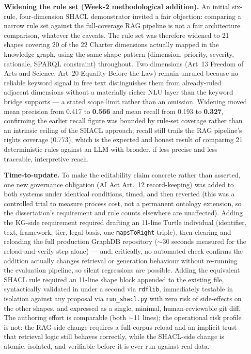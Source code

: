 \textbf{Widening the rule set (Week-2 methodological addition).} An initial six-rule, four-dimension SHACL demonstrator invited a fair objection: comparing a narrow rule set against the full-coverage RAG pipeline is not a fair architecture comparison, whatever the caveats. The rule set was therefore widened to 21 shapes covering 20 of the 22 Charter dimensions actually mapped in the knowledge graph, using the same shape pattern (dimension, priority, severity, rationale, SPARQL constraint) throughout. Two dimensions (Art~13 Freedom of Arts and Science; Art~20 Equality Before the Law) remain unruled because no reliable keyword signal in free text distinguishes them from already-ruled adjacent dimensions without a materially richer NLU layer than the keyword bridge supports --- a stated scope limit rather than an omission. Widening moved mean precision from 0.417 to \textbf{0.566} and mean recall from 0.193 to \textbf{0.327}, confirming the earlier recall figure was bounded by rule-set coverage rather than an intrinsic ceiling of the SHACL approach; recall still trails the RAG pipeline's rights coverage (0.773), which is the expected and honest result of comparing 21 deterministic rules against an LLM with broader, if less precise and less traceable, interpretive reach.

\textbf{Time-to-update.} To make the editability claim concrete rather than asserted, one new governance obligation (AI Act Art.~12 record-keeping) was added to both systems under identical conditions, timed, and then reverted (this was a controlled trial to measure process cost, not a permanent ontology extension, so the dissertation's requirement and rule counts elsewhere are unaffected). Adding the KG-side requirement required drafting an 11-line Turtle individual (identifier, text, framework, tier, legal basis, one \texttt{mapsToRight} triple), then clearing and reloading the full production GraphDB repository ($\sim$30 seconds measured for the reload-and-verify step alone) --- and, critically, no automated check confirms the addition actually changes retrieval or generation behaviour without re-running the evaluation pipeline, so silent regressions are possible. Adding the equivalent SHACL rule required an 11-line shape block appended to the existing file, syntactically validated in under a second via \texttt{rdflib}, immediately testable in isolation against any proposal via \texttt{run\_shacl.py} with zero risk of side-effects on the other shapes, and expressed as a single, minimal, human-reviewable git diff. The authoring effort is comparable (both $\sim$11 lines); the operational risk profile is not: the RAG-side change requires a full-corpus reload and an implicit trust that retrieval logic still behaves correctly, while the SHACL-side change is atomic, isolated, and verifiable before it is ever run against real data.


